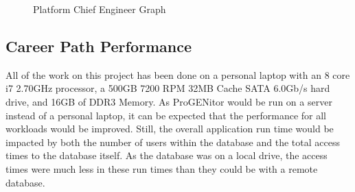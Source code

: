 \begin{figure}[H]
{
}

	\caption{Platform Chief Engineer Graph}
	\label{fig:node map pce}
\end{figure}


\subsection{Career Path Performance}
All of the work on this project has been done on a personal laptop with an 8
core i7 2.70GHz processor, a 500GB 7200 RPM 32MB Cache SATA 6.0Gb/s hard drive,
and 16GB of DDR3 Memory.  As ProGENitor would be run on a server instead of a
personal laptop, it can be expected that the performance for all workloads would
be improved.  Still, the overall application run time would be impacted by both
the number of users within the database and the total access times to the
database itself.  As the database was on a local drive, the access times were
much less in these run times than they could be with a remote database.  

